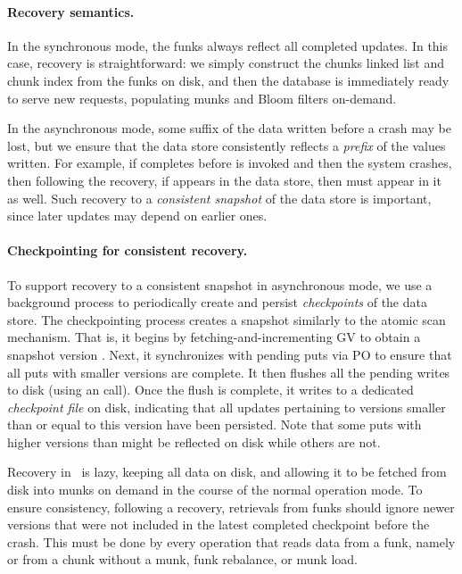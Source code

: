 \paragraph{Recovery semantics.}
In the synchronous mode, 
the funks always reflect all completed updates. In this case, recovery is straightforward: we simply construct
the chunks linked list and chunk index from the funks on disk, and then the database is immediately ready to serve new requests, populating munks and Bloom filters on-demand.  

In the asynchronous mode, some suffix of the  data written before a crash may be lost, but we  
ensure that the data store consistently reflects a \emph{prefix} of the  values written.
For example, if  completes before  
is invoked and then the system crashes, then following the recovery, 
if  appears in the data store, then  must appear in it as well. 
Such recovery to a \emph{consistent snapshot} of the data store is important, since later updates may depend on earlier ones. 

\paragraph{Checkpointing for consistent recovery.}
To support recovery to a consistent snapshot in asynchronous mode, we use a background process to
periodically create and persist \emph{checkpoints} of the data store.
The checkpointing process creates a snapshot similarly to the atomic scan mechanism. That is, 
it begins by fetching-and-incrementing GV to obtain a 
 snapshot version .  Next, 
it synchronizes with pending puts via PO to ensure that all puts with smaller versions are complete. 
It then flushes all the pending writes to disk (using an  call). 
Once the flush is complete, it writes  to a dedicated \emph{checkpoint file} on disk,
indicating that all updates pertaining to versions smaller than or equal to this version have been persisted.
Note that some puts with higher versions than  might be reflected on disk while others are not. 

Recovery in \sys\ is lazy, keeping all data on disk, and 
allowing it to be fetched from disk into munks  on demand in the course of the normal operation mode. 
To ensure consistency, following a recovery,  
retrievals from funks should ignore newer versions that were not included in the latest completed checkpoint before the crash. 
This must be done by every operation that reads data from a funk, namely  or  from a chunk without a munk, 
funk rebalance, or munk load. 


